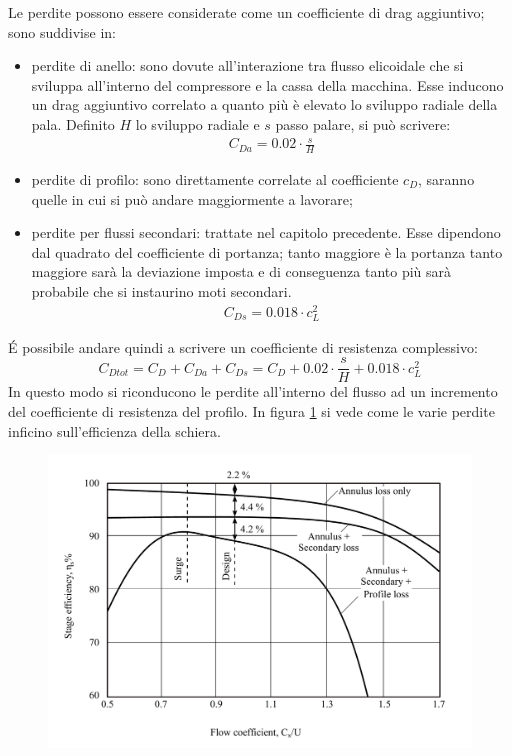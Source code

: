 Le perdite possono essere considerate come un coefficiente di drag aggiuntivo; sono suddivise in:
\begin{itemize}
\item perdite di anello: sono dovute all'interazione tra flusso elicoidale che si sviluppa all'interno del compressore e la cassa della macchina. Esse inducono un drag aggiuntivo correlato a quanto più è elevato lo sviluppo radiale della pala. Definito $H$ lo sviluppo radiale e $s$ passo palare, si può scrivere:
\begin{align*}
C_{Da} = 0.02 \cdot \frac{s}{H}
\end{align*}
\item perdite di profilo: sono direttamente correlate al coefficiente $c_D$, saranno quelle in cui si può andare maggiormente a lavorare;
\item perdite per flussi secondari: trattate nel capitolo precedente. Esse dipendono dal quadrato del coefficiente di portanza; tanto maggiore è la portanza tanto maggiore sarà la deviazione imposta e di conseguenza tanto più sarà probabile che si instaurino moti secondari.
\begin{align*}
C_{Ds} = 0.018 \cdot c_L^2
\end{align*}
\end{itemize}
\'E possibile andare quindi a scrivere un coefficiente di resistenza complessivo:
\begin{equation}
C_{Dtot} = C_D + C_{Da} + C_{Ds} = C_D + 0.02 \cdot \frac{s}{H} + 0.018 \cdot c_L^2
\label{eq:Cdtot}
\end{equation}
In questo modo si riconducono le perdite all'interno del flusso ad un incremento del coefficiente di resistenza del profilo. In figura \ref{fig:ComprStageLoss} si vede come le varie perdite inficino sull'efficienza della schiera.
\begin{figure}[h!]
\centering
  \includegraphics[width=\textwidth]{fig/ComprStageLoss.pdf}
\caption{}
\label{fig:ComprStageLoss}
\end{figure}
